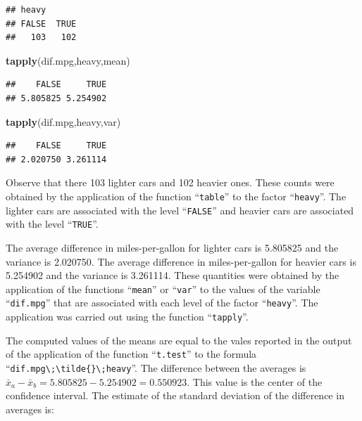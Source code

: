 \documentclass[
]{krantz}
\makeatletter
\newenvironment{Shaded}{\begin{snugshade}}{\end{snugshade}}
\newcommand{\KeywordTok}[1]{\textcolor[rgb]{0.13,0.29,0.53}{\textbf{#1}}}
\newcommand{\NormalTok}[1]{#1}
\newenvironment{kframe}{%
\medskip{}
\setlength{\fboxsep}{.8em}
 \def\at@end@of@kframe{}%
 \ifinner\ifhmode%
  \def\at@end@of@kframe{\end{minipage}}%
  \begin{minipage}{\columnwidth}%
 \fi\fi%
 \def\FrameCommand##1{\hskip\@totalleftmargin \hskip-\fboxsep
 \colorbox{shadecolor}{##1}\hskip-\fboxsep
     \hskip-\linewidth \hskip-\@totalleftmargin \hskip\columnwidth}%
 \MakeFramed {\advance\hsize-\width
   \@totalleftmargin\z@ \linewidth\hsize
   \@setminipage}}%
 {\par\unskip\endMakeFramed%
 \at@end@of@kframe}
\renewenvironment{Shaded}{\begin{kframe}}{\end{kframe}}
\theoremstyle{definition}
\theoremstyle{definition}
\theoremstyle{definition}
\theoremstyle{remark}
\makeatother
\begin{document}
\begin{verbatim}
## heavy
## FALSE  TRUE 
##   103   102
\end{verbatim}

\begin{Shaded}
\begin{Highlighting}[]
\KeywordTok{tapply}\NormalTok{(dif.mpg,heavy,mean)}
\end{Highlighting}
\end{Shaded}

\begin{verbatim}
##    FALSE     TRUE 
## 5.805825 5.254902
\end{verbatim}

\begin{Shaded}
\begin{Highlighting}[]
\KeywordTok{tapply}\NormalTok{(dif.mpg,heavy,var)}
\end{Highlighting}
\end{Shaded}

\begin{verbatim}
##    FALSE     TRUE 
## 2.020750 3.261114
\end{verbatim}

Observe that there 103 lighter cars and 102 heavier ones. These counts
were obtained by the application of the function ``\texttt{table}'' to the factor
``\texttt{heavy}''. The lighter cars are associated with the level ``\texttt{FALSE}'' and
heavier cars are associated with the level ``\texttt{TRUE}''.

The average difference in miles-per-gallon for lighter cars is 5.805825
and the variance is 2.020750. The average difference in miles-per-gallon
for heavier cars is 5.254902 and the variance is 3.261114. These
quantities were obtained by the application of the functions ``\texttt{mean}'' or
``\texttt{var}'' to the values of the variable ``\texttt{dif.mpg}'' that are associated
with each level of the factor ``\texttt{heavy}''. The application was carried out
using the function ``\texttt{tapply}''.

The computed values of the means are equal to the vales reported in the
output of the application of the function ``\texttt{t.test}'' to the formula
``\texttt{dif.mpg\textbackslash{};\textbackslash{}tilde\{\}\textbackslash{};heavy}''. The difference between the averages is
\(\bar x_a - \bar x_b = 5.805825 - 5.254902 = 0.550923\). This value is
the center of the confidence interval. The estimate of the standard
deviation of the difference in averages is:
\end{document}
